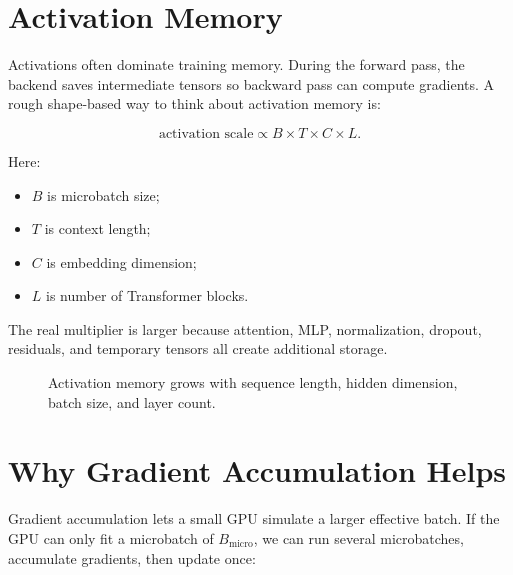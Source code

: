 \section{Activation Memory}

Activations often dominate training memory. During the forward pass, the backend saves
intermediate tensors so backward pass can compute gradients. A rough shape-based way to
think about activation memory is:

\[
\text{activation scale} \propto B \times T \times C \times L.
\]

Here:

\begin{itemize}
  \item \(B\) is microbatch size;
  \item \(T\) is context length;
  \item \(C\) is embedding dimension;
  \item \(L\) is number of Transformer blocks.
\end{itemize}

The real multiplier is larger because attention, MLP, normalization, dropout, residuals,
and temporary tensors all create additional storage.

\begin{figure}[htbp]
\centering
{}
\caption{Activation memory grows with sequence length, hidden dimension, batch size, and layer count.}
\end{figure}

\section{Why Gradient Accumulation Helps}

Gradient accumulation lets a small GPU simulate a larger effective batch. If the GPU can
only fit a microbatch of \(B_{\text{micro}}\), we can run several microbatches, accumulate
gradients, then update once:

